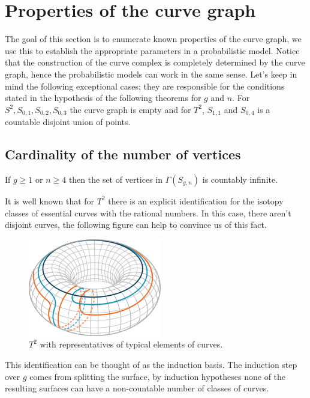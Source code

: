 \section{Properties of the curve graph}
The goal of this section is to enumerate known properties of the curve graph, we use this to establish the appropriate parameters in a probabilistic model. Notice that the construction of the curve complex is completely determined by the curve graph, hence the probabilistic models can work in the same sense. Let's keep in mind the following exceptional cases; they are responsible for the conditions stated in the hypothesis of the following theorems for $g$ and $n$. For $ S^2, S_{0,1}, S _{0,2}, S_{0,3} $ the curve graph is empty and for  $ T^{2} $, $ S_{1,1}$ and $ S_{0,4}$ is a countable disjoint union of points.

\subsection{Cardinality of the number of vertices}
\begin{theorem}
If $g\geq 1$ or $n\geq 4$ then the set of vertices in $\Gamma(S_{g,n})$ is countably infinite.
\end{theorem}

It is well known that for $T^{2}$ there is an explicit identification for the isotopy classes of essential curves with the rational numbers. In this case, there aren't disjoint curves, the following figure can help to convince us of this fact.
\vspace{0.5cm}
\begin{figure}[h!]
	\centering
	\includegraphics[scale=1]{Figures/Torus.png}
	\caption{$T^{2}$ with representatives of typical elements of curves.}
\end{figure}

This identification can be thought of as the induction basis. The induction step over $g$ comes from splitting the surface, by induction hypotheses none of the resulting surfaces can have a non-countable number of classes of curves.

